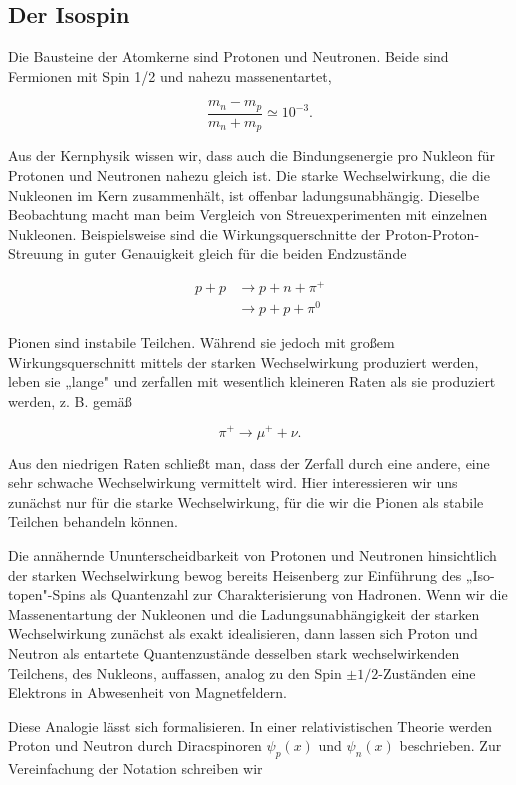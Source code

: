 \documentclass[10pt, letterpaper]{article}
\begin{document}
\subsection*{Der Isospin}
Die Bausteine der Atomkerne sind Protonen und Neutronen. Beide sind Fermionen mit Spin 1/2 und nahezu massenentartet,

$$
\frac{m_{n}-m_{p}}{m_{n}+m_{p}} \simeq 10^{-3} .
$$

Aus der Kernphysik wissen wir, dass auch die Bindungsenergie pro Nukleon für Protonen und Neutronen nahezu gleich ist. Die starke Wechselwirkung, die die Nukleonen im Kern zusammenhält, ist offenbar ladungsunabhängig. Dieselbe Beobachtung macht man beim Vergleich von Streuexperimenten mit einzelnen Nukleonen. Beispielsweise sind die Wirkungsquerschnitte der Proton-Proton-Streuung in guter Genauigkeit gleich für die beiden Endzustände

$$
\begin{aligned}
p+p & \longrightarrow p+n+\pi^{+} \\
& \longrightarrow p+p+\pi^{0}
\end{aligned}
$$

Pionen sind instabile Teilchen. Während sie jedoch mit großem Wirkungsquerschnitt mittels der starken Wechselwirkung produziert werden, leben sie „lange" und zerfallen mit wesentlich kleineren Raten als sie produziert werden, z. B. gemäß

$$
\pi^{+} \longrightarrow \mu^{+}+\nu .
$$

Aus den niedrigen Raten schließt man, dass der Zerfall durch eine andere, eine sehr schwache Wechselwirkung vermittelt wird. Hier interessieren wir uns zunächst nur für die starke Wechselwirkung, für die wir die Pionen als stabile Teilchen behandeln können.

Die annähernde Ununterscheidbarkeit von Protonen und Neutronen hinsichtlich der starken Wechselwirkung bewog bereits Heisenberg zur Einführung des „Iso-topen"-Spins als Quantenzahl zur Charakterisierung von Hadronen. Wenn wir die Massenentartung der Nukleonen und die Ladungsunabhängigkeit der starken Wechselwirkung zunächst als exakt idealisieren, dann lassen sich Proton und Neutron als entartete Quantenzustände desselben stark wechselwirkenden Teilchens, des Nukleons, auffassen, analog zu den Spin $\pm 1 / 2$-Zuständen eine Elektrons in Abwesenheit von Magnetfeldern.

Diese Analogie lässt sich formalisieren. In einer relativistischen Theorie werden Proton und Neutron durch Diracspinoren $\psi_{p}(x)$ und $\psi_{n}(x)$ beschrieben. Zur Vereinfachung der Notation schreiben wir
\end{document}
